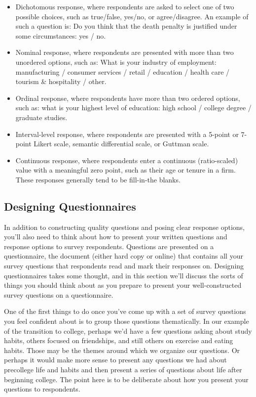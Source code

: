 \begin{itemize}
\item Dichotomous response, where respondents are asked to select one of two possible choices, such as true/false, yes/no, or agree/disagree. An example of such a question is: Do you think that the death penalty is justified under some circumstances: yes / no.
\item Nominal response, where respondents are presented with more than two unordered options, such as: What is your industry of employment: manufacturing / consumer services / retail / education / health care / tourism \& hospitality / other.
\item Ordinal response, where respondents have more than two ordered options, such as: what is your highest level of education: high school / college degree / graduate studies.
\item Interval-level response, where respondents are presented with a 5-point or 7-point Likert scale, semantic differential scale, or Guttman scale. 
\item Continuous response, where respondents enter a continuous (ratio-scaled) value with a meaningful zero point, such as their age or tenure in a firm. These responses generally tend to be fill-in-the blanks.
\end{itemize}
\subsection{Designing Questionnaires}

In addition to constructing quality questions and posing clear response options, you’ll also need to think about how to present your written questions and response options to survey respondents. Questions are presented on a questionnaire, the document (either hard copy or online) that contains all your survey questions that respondents read and mark their responses on. Designing questionnaires takes some thought, and in this section we’ll discuss the sorts of things you should think about as you prepare to present your well-constructed survey questions on a questionnaire.

One of the first things to do once you’ve come up with a set of survey questions you feel confident about is to group those questions thematically. In our example of the transition to college, perhaps we’d have a few questions asking about study habits, others focused on friendships, and still others on exercise and eating habits. Those may be the themes around which we organize our questions. Or perhaps it would make more sense to present any questions we had about precollege life and habits and then present a series of questions about life after beginning college. The point here is to be deliberate about how you present your questions to respondents.

